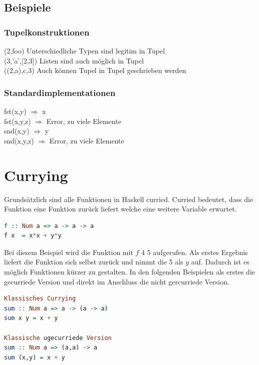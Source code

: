 \subsection{Beispiele}
\subsubsection{Tupelkonstruktionen}
(2,\grqq foo\grqq  ) Unterschiedliche Typen sind legitim in Tupel\\
(3,'a',[2,3]) Listen sind auch möglich in Tupel\\
((2,\grqq a\grqq),\grqq c\grqq ,3) Auch können Tupel in Tupel geschrieben werden\\
\subsubsection{Standardimplementationen}
fst(x,y) $\Rightarrow$ x \\
fst(x,y,z) $\Rightarrow$ Error, zu viele Elemente \\
snd(x,y) $\Rightarrow$ y\\
snd(x,y,z) $\Rightarrow$ Error, zu viele Elemente

\section{Currying}
Grundsätzlich sind alle Funktionen in Haskell curried. Curried bedeutet, dass die Funktion eine Funktion zurück liefert welche eine weitere Variable erwartet. 
\newline
\begin{lstlisting}[language=Haskell]  
f :: Num a => a -> a -> a 
f x  = x*x + y*y
\end{lstlisting}
\qquad\newline
Bei diesem Beispiel wird die Funktion mit $f$ 4 5 aufgerufen. Als erstes Ergebnis liefert die Funktion sich selbst zurück und nimmt die 5 als $y$ auf. Dadurch ist es möglich Funktionen kürzer zu gestalten. In den folgenden Beispielen als erstes die gecurriede Version und direkt im Anschluss die nicht gercurriede Version. 
\newline
\begin{lstlisting}[language=Haskell]  
Klassisches Currying
sum :: Num a => a -> (a -> a)
sum x y = x + y

Klassische ugecurriede Version
sum :: Num a => (a,a) -> a
sum (x,y) = x + y
\end{lstlisting}
\qquad\newline
